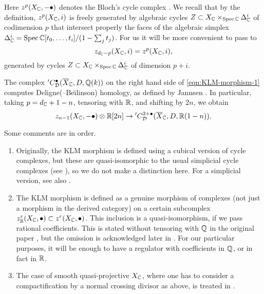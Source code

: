 \documentclass{article}
\numberwithin{equation}{section}
\begin{document}
Here $z^p (X_{\mathbb{C}}, -\bullet)$ denotes the Bloch's cycle complex
\cite{Bloch-1986}. We recall that by the definition, $z^p (X_{\mathbb{C}}, i)$ is freely
generated by algebraic cycles $Z \subset X_{\mathbb{C}} \times_{\operatorname{Spec} \mathbb{C}} \Delta_{\mathbb{C}}^i$
of codimension $p$ that intersect properly the faces of the algebraic simplex
$\Delta_{\mathbb{C}}^i = \operatorname{Spec} \mathbb{C} [t_0,\ldots,t_i]/(1 - \sum_j t_j)$. For us it will be
more convenient to pass to
$$z_{d_{\mathbb{C}} - p} (X_{\mathbb{C}}, i) = z^p (X_{\mathbb{C}}, i),$$
generated by cycles $Z \subset X_{\mathbb{C}} \times_{\operatorname{Spec} \mathbb{C}} \Delta_{\mathbb{C}}^i$ of
dimension $p+i$.

The complex ${}' C_\mathcal{D}^{\bullet} (\overline{X}_{\mathbb{C}}, D, \mathbb{Q} (k))$ on the
right hand side of \eqref{eqn:KLM-morphism-1} computes Deligne(--Be\u{\i}linson)
homology, as defined by Jannsen \cite{Jannsen-1988}. In particular, taking
$p = d_{\mathbb{C}} + 1 - n$, tensoring with $\mathbb{R}$, and shifting by $2n$, we obtain
\begin{equation}
  \label{eqn:KLM-morphism-2}
  z_{n-1} (X_{\mathbb{C}}, -\bullet) \otimes \mathbb{R} [2n] \to
  {}' C_\mathcal{D}^{2 + \bullet} (\overline{X}_{\mathbb{C}}, D, \mathbb{R} (1-n)).
\end{equation}

\begin{remark}
  Some comments are in order.

  \begin{enumerate}
  \item Originally, the KLM morphism is defined using a cubical version of cycle
    complexes, but these are quasi-isomorphic to the usual simplicial cycle
    complexes (see \cite{Levine-1994}), so we do not make a distinction here.
    For a simplicial version, see also \cite{Kerr-Lewis-Lopatto-2018}.

  \item The KLM morphism is defined as a genuine morphism of complexes (not just
    a morphism in the derived category) on a certain subcomplex
    $z^r_{\mathbb{R}} (X_{\mathbb{C}}, \bullet) \subset z^r (X_{\mathbb{C}}, \bullet)$. This inclusion is a
    quasi-isomorphism, if we pass rational coefficients. This is stated without
    tensoring with $\mathbb{Q}$ in the original paper
    \cite{Kerr-Lewis-Muller-Stach-2006}, but the omission is acknowledged later
    in \cite{Kerr-Lewis-2007}. For our particular purposes, it will be enough to
    have a regulator with coefficients in $\mathbb{Q}$, or in fact in $\mathbb{R}$.

  \item The case of smooth quasi-projective $X_{\mathbb{C}}$, where one has to consider a
    compactification by a normal crossing divisor as above, is treated in
    \cite[\S 5.9]{Kerr-Lewis-Muller-Stach-2006}.
  \end{enumerate}
\end{remark}
\end{document}
